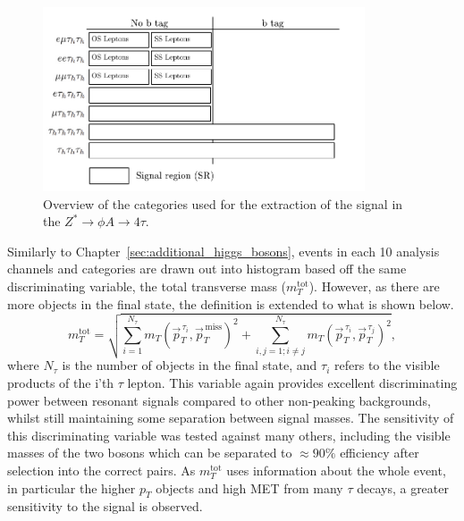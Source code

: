 \begin{figure}[!hbtp]
\centering
    \includegraphics[width=0.85\textwidth]{Figures/event-categories_4tau.pdf}
\caption{Overview of the categories used for the extraction of the signal in the $Z^{*}\rightarrow \phi A \rightarrow 4\tau$.}
\label{fig:4tau_categories}
\end{figure}

Similarly to Chapter~\ref{sec:additional_higgs_bosons}, events in each 10 analysis channels and categories are drawn out into histogram based off the same discriminating variable, the total transverse mass ($m_{T}^{\text{tot
}}$).
However, as there are more objects in the final state, the definition is extended to what is shown below.
\begin{equation}
m_{T}^{\text{tot}} = \sqrt{ \sum_{i=1}^{N_\tau} m_{T}(\vec{p}_{T}^{\hspace{2pt}\tau_i},\vec{p}_{T}^{\hspace{2pt}\text{miss}})^2 + \sum_{i,j=1; i \neq j}^{N_\tau} m_{T}(\vec{p}_{T}^{\hspace{2pt}\tau_i},\vec{p}_{T}^{\hspace{2pt}\tau_j})^2 },  
\end{equation}
where $N_\tau$ is the number of objects in the final state, and $\tau_i$ refers to the visible products of the i'th $\tau$ lepton.
This variable again provides excellent discriminating power between resonant signals compared to other non-peaking backgrounds, whilst still maintaining some separation between signal masses.
The sensitivity of this discriminating variable was tested against many others, including the visible masses of the two bosons which can be separated to $\approx 90\%$ efficiency after selection into the correct pairs. 
As $m_{T}^{\text{tot}}$ uses information about the whole event, in particular the higher $p_{T}$ objects and high MET from many $\tau$ decays, a greater sensitivity to the signal is observed. \\

